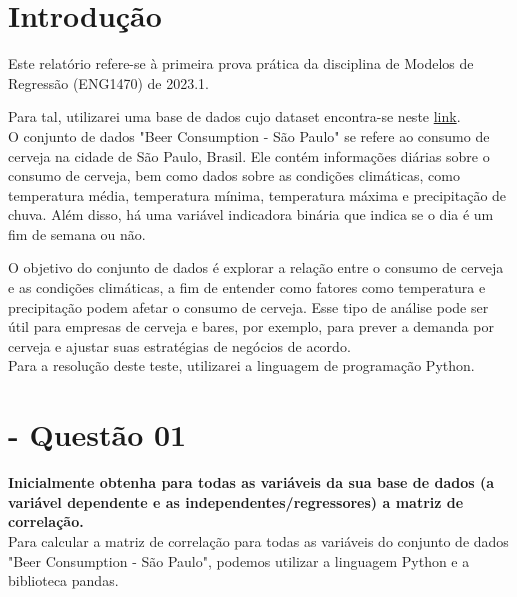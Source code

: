 \documentclass[a4paper, 12pt]{article}
\begin{document}
\newpage


\newpage

\listoffigures
\thispagestyle{empty}

\newpage

\newpage

\thispagestyle{empty}

\newpage

\section*{Introdução}
Este relatório refere-se à primeira prova prática da disciplina de Modelos de Regressão (ENG1470) de 2023.1. 

Para tal, utilizarei uma base de dados cujo dataset encontra-se neste \href{https://www.kaggle.com/datasets/dongeorge/beer-consumption-sao-paulo}{link}. \\

O conjunto de dados "Beer Consumption - São Paulo"  se refere ao consumo de cerveja na cidade de São Paulo, Brasil. Ele contém informações diárias sobre o consumo de cerveja, bem como dados sobre as condições climáticas, como temperatura média, temperatura mínima, temperatura máxima e precipitação de chuva. Além disso, há uma variável indicadora binária que indica se o dia é um fim de semana ou não.

O objetivo do conjunto de dados é explorar a relação entre o consumo de cerveja e as condições climáticas, a fim de entender como fatores como temperatura e precipitação podem afetar o consumo de cerveja. Esse tipo de análise pode ser útil para empresas de cerveja e bares, por exemplo, para prever a demanda por cerveja e ajustar suas estratégias de negócios de acordo.\\

Para a resolução deste teste, utilizarei a linguagem de programação Python.

\section{- Questão 01}
\textbf{Inicialmente obtenha para todas as variáveis da sua base de dados (a variável dependente e as independentes/regressores) a matriz de correlação.} \\

Para calcular a matriz de correlação para todas as variáveis do conjunto de dados "Beer Consumption - São Paulo", podemos utilizar a linguagem Python e a biblioteca pandas.\\
\end{document}
